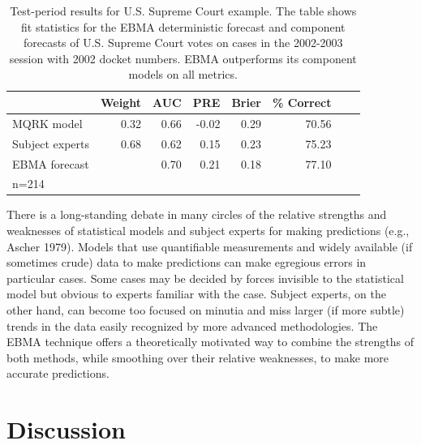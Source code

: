 \documentclass[12pt,fullpage,endnotes]{article}
\begin{document}
\begin{table}[h!]
  \caption{\footnotesize Test-period results for U.S. Supreme Court
    example.  The table shows fit statistics for the EBMA deterministic
    forecast and component forecasts of U.S. Supreme Court votes on
    cases in the 2002-2003 session with 2002 docket numbers.   EBMA 
    outperforms its component models on all metrics. }
\label{SC-Res} \small
\begin{center}
\begin{tabular}{lrrrrrrr}
\toprule
 & Weight & AUC & PRE & Brier & \% Correct   \\ 
\midrule
MQRK model& 0.32  &0.66 & -0.02 & 0.29 & 70.56  \\ 
Subject experts & 0.68 &0.62 & 0.15 & 0.23 & 75.23 \\ 
EBMA forecast&  & 0.70 & 0.21 & 0.18 & 77.10  \\ 
\bottomrule
n=214 
\end{tabular}
\end{center}
\end{table} 

There is a long-standing debate in many circles of the relative
strengths and weaknesses of statistical models and subject experts for
making predictions (e.g., Ascher 1979). Models that use quantifiable
measurements and widely available (if sometimes crude) data to make
predictions can make egregious errors in particular cases. Some cases
may be decided by forces invisible to the statistical model but
obvious to experts familiar with the case. Subject experts, on the
other hand, can become too focused on minutia and miss larger (if more
subtle) trends in the data easily recognized by more advanced
methodologies. The EBMA technique offers a theoretically motivated way
to combine the strengths of both methods, while smoothing over their
relative weaknesses, to make more accurate predictions.

\section{Discussion} %
\end{document}
